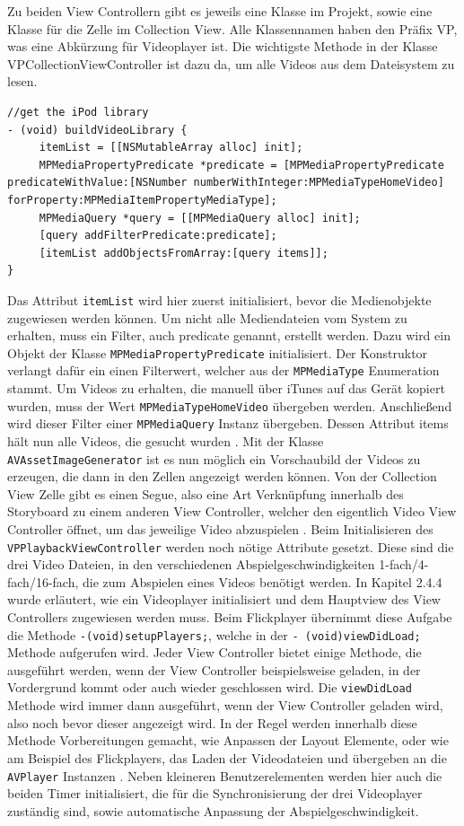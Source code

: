 \documentclass[11pt,a4paper]{report}
\begin{document}
Zu beiden View Controllern gibt es jeweils eine Klasse im Projekt, sowie eine Klasse für die Zelle im Collection View. Alle Klassennamen haben den Präfix VP, was eine Abkürzung für Videoplayer ist. Die wichtigste Methode in der Klasse VPCollectionViewController ist dazu da, um alle Videos aus dem Dateisystem zu lesen.
\begin{lstlisting}
//get the iPod library
- (void) buildVideoLibrary {
	 itemList = [[NSMutableArray alloc] init];
	 MPMediaPropertyPredicate *predicate = [MPMediaPropertyPredicate predicateWithValue:[NSNumber numberWithInteger:MPMediaTypeHomeVideo] forProperty:MPMediaItemPropertyMediaType];
	 MPMediaQuery *query = [[MPMediaQuery alloc] init];
	 [query addFilterPredicate:predicate];
	 [itemList addObjectsFromArray:[query items]];
}
\end{lstlisting}
Das Attribut \texttt{itemList} wird hier zuerst initialisiert, bevor die Medienobjekte zugewiesen werden können. Um nicht alle Mediendateien vom System zu erhalten, muss ein Filter, auch predicate genannt, erstellt werden. Dazu wird ein Objekt der Klasse \texttt{MPMediaPropertyPredicate} initialisiert. Der Konstruktor verlangt dafür ein einen Filterwert, welcher aus der \texttt{MPMediaType} Enumeration stammt. Um Videos zu erhalten, die manuell über iTunes auf das Gerät kopiert wurden, muss der Wert \texttt{MPMediaTypeHomeVideo} übergeben werden. Anschließend wird dieser Filter einer \texttt{MPMediaQuery} Instanz übergeben. Dessen Attribut items hält nun alle Videos, die gesucht wurden \cite{MPMediaQueryClassReference}. Mit der Klasse \texttt{AVAssetImageGenerator} ist es nun möglich ein Vorschaubild der Videos zu erzeugen, die dann in den Zellen angezeigt werden können. Von der Collection View Zelle gibt es einen Segue, also eine Art Verknüpfung innerhalb des Storyboard zu einem anderen View Controller, welcher den eigentlich Video View Controller öffnet, um das jeweilige Video abzuspielen \cite{StoryboardSegue}. Beim Initialisieren des \texttt{VPPlaybackViewController} werden noch nötige Attribute gesetzt. Diese sind die drei Video Dateien, in den verschiedenen Abspielgeschwindigkeiten 1-fach/4-fach/16-fach, die zum Abspielen eines Videos benötigt werden. In Kapitel 2.4.4 wurde erläutert, wie ein Videoplayer initialisiert und dem Hauptview des View Controllers zugewiesen werden muss. Beim Flickplayer übernimmt diese Aufgabe die Methode \texttt{-(void)setupPlayers;}, welche in der \texttt{- (void)viewDidLoad;} Methode aufgerufen wird. Jeder View Controller bietet einige Methode, die ausgeführt werden, wenn der View Controller beispielsweise geladen, in der Vordergrund kommt oder auch wieder geschlossen wird. Die \texttt{viewDidLoad} Methode wird immer dann ausgeführt, wenn der View Controller geladen wird, also noch bevor dieser angezeigt wird. In der Regel werden innerhalb diese Methode Vorbereitungen gemacht, wie Anpassen der Layout Elemente, oder wie am Beispiel des Flickplayers, das Laden der Videodateien und übergeben an die \texttt{AVPlayer} Instanzen \cite{UIViewControllerClass}. Neben kleineren Benutzerelementen werden hier auch die beiden Timer initialisiert, die für die Synchronisierung der drei Videoplayer zuständig sind, sowie automatische Anpassung der Abspielgeschwindigkeit. 
\end{document}
